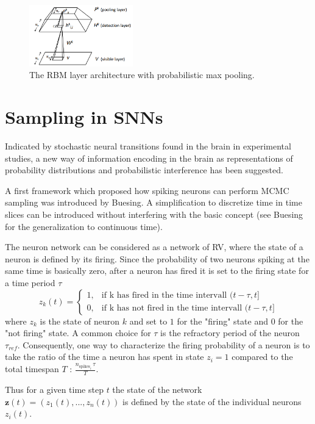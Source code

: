\begin{figure}
	\centering
    	\includegraphics[width=0.4\textwidth]{imgs/prob_max_pool.png} 
    \caption{The RBM layer architecture with probabilistic max pooling.}
	\label{fig:probmaxpool}
\end{figure}


\section{Sampling in SNNs}

Indicated by stochastic neural transitions found in the brain in experimental studies, a new way of information encoding in the brain as representations of probability distributions and probabilistic interference has been suggested.


A first framework which proposed how spiking neurons can perform MCMC sampling was introduced by Buesing.
A simplification to discretize time in time slices can be introduced without interfering with the basic concept (see Buesing for the generalization to continuous time).

The neuron network can be considered as a network of RV, where the state of a neuron is defined by its firing. 
Since the probability of two neurons spiking at the same time is basically zero, after a neuron has fired it is set to the firing state for a time period $\tau$
\[
z_k(t) = 
\begin{cases}
1, &  \text{if k has fired in the time intervall } (t - \tau , t ] \\
0, &  \text{if k has not fired in the time intervall } (t - \tau , t ] 
\end{cases}
\] 
where $z_k$ is the state of neuron $k$ and set to $1$ for the "firing" state and $0$ for the "not firing" state. A common choice for $\tau$ is the refractory period of the neuron $\tau_{ref}$.
Consequently, one way to characterize the firing probability of a neuron is to take the ratio of the time a neuron has spent in state $z_i=1$ compared to the total timespan $T$ : $\frac{n_{\text{spikes}_i} \, \tau}{ T }$.

Thus for a given time step $t$ the state of the network $\textbf{z}(t) = (z_1(t), ... ,z_n(t))$ is defined by the state of the individual neurons $z_i(t)$. 


